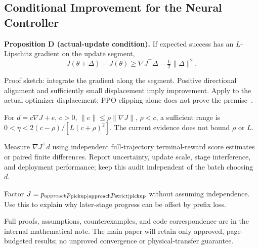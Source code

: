 \subsection{Conditional Improvement for the Neural Controller}
\begin{outline}
\item \textbf{Proposition D (actual-update condition).} If expected success has an $L$-Lipschitz gradient on the update segment,
\begin{equation}
J(\theta+\Delta)-J(\theta)\ge
\nabla J^\top\Delta-\tfrac{L}{2}\|\Delta\|^2.
\end{equation}
\item Proof sketch: integrate the gradient along the segment. Positive directional alignment and sufficiently small displacement imply improvement. Apply to the actual optimizer displacement; PPO clipping alone does not prove the premise~\cite{trpo}.
\item For $d=c\nabla J+e$, $c>0$, $\|e\|\le\rho\|\nabla J\|$, $\rho<c$, a sufficient range is $0<\eta<2(c-\rho)/[L(c+\rho)^2]$. The current evidence does not bound $\rho$ or $L$.
\item Measure $\nabla J^\top d$ using independent full-trajectory terminal-reward score estimates or paired finite differences. Report uncertainty, update scale, stage interference, and deployment performance; keep this audit independent of the batch choosing $d$.
\item Factor $J=p_{\rm approach}p_{\rm pickup\mid approach}p_{\rm strict\mid pickup}$ without assuming independence. Use this to explain why later-stage progress can be offset by prefix loss.
\item Full proofs, assumptions, counterexamples, and code correspondence are in the internal mathematical note. The main paper will retain only approved, page-budgeted results; no unproved convergence or physical-transfer guarantee.
\end{outline}
